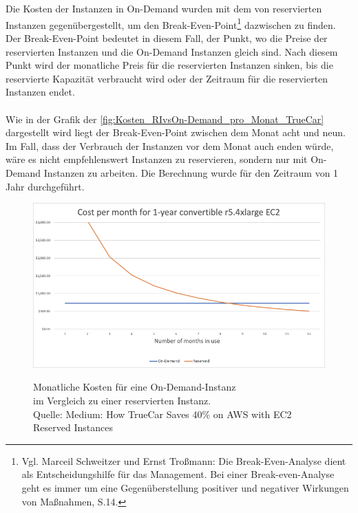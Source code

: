 \\\\
Die Kosten der Instanzen in On-Demand wurden mit dem von reservierten Instanzen gegenübergestellt, um den Break-Even-Point\footnote{Vgl. Marceil Schweitzer und Ernst Troßmann: Die Break-Even-Analyse dient als Entscheidungshilfe für das Management. Bei einer Break-even-Analyse geht es immer um eine Gegenüberstellung positiver und negativer Wirkungen von Maßnahmen, S.14.\cite{BEA} } dazwischen zu finden. Der Break-Even-Point bedeutet in diesem Fall, der Punkt, wo die Preise der reservierten Instanzen und die On-Demand Instanzen gleich sind. Nach diesem Punkt wird der monatliche Preis für die reservierten Instanzen sinken, bis die reservierte Kapazität verbraucht wird oder der Zeitraum für die reservierten Instanzen endet.
\\\\
Wie in der Grafik der \autoref{fig:Kosten_RIvsOn-Demand_pro_Monat_TrueCar} dargestellt wird liegt der Break-Even-Point zwischen dem Monat acht und neun. Im Fall, dass der Verbrauch der Instanzen vor dem Monat auch enden würde, wäre es nicht empfehlenswert Instanzen zu reservieren, sondern nur mit On-Demand Instanzen zu arbeiten. Die Berechnung wurde für den Zeitraum von 1 Jahr durchgeführt. %
\begin{figure}[h!]
  \centering
  \includegraphics[scale=0.6]{sources/Kosten_RIvsOn-Demand_pro_Monat_TrueCar}\label{fig:Kosten_RIvsOn-Demand_pro_Monat_TrueCar}\\
  \caption[Monatliche Kosten für eine On-Demand-Instanz im Vergleich zu einer reservierten Instanz]{}
  \label{fig:Kosten_RIvsOn-Demand_pro_Monat_TrueCar}Monatliche Kosten für eine On-Demand-Instanz\\ im Vergleich zu einer reservierten Instanz.\\
  Quelle: Medium: How TrueCar Saves 40\% on AWS with EC2 Reserved Instances{\cite{MED1}}
\end{figure}
